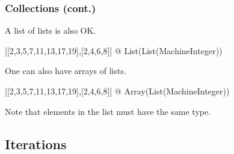 \begin{frame}[fragile]
  \frametitle<presentation>{Collections (cont.)}

A list of lists is also OK.
\begin{myverbatim}
[[2,3,5,7,11,13,17,19],[2,4,6,8]] @ List(List(MachineInteger))
\end{myverbatim}
One can also have arrays of lists.
\begin{myverbatim}
[[2,3,5,7,11,13,17,19],[2,4,6,8]] @ Array(List(MachineInteger))
\end{myverbatim}
Note that elements in the list must have the same type.
\end{frame}
\begin{comment}
<<Collections>>=
aldor -gloop
macro I == MachineInteger;
import from I, List I;
u1 := [2,3,5,7,11,13,17,19]
u2 := [2*i for i in 1..4]
u3 := [2*i for i in 9 .. -9 by -2]
u4 := [5*i for i in 20 .. -20 by -3 | bit?(i,2)]
[3*i for i in u1 | not(i=11)]
[u3.(2*i) for i in 1..3]
[a+b for a in [1, 4, 0] for b in [2,5,7,9,11]]
v1: List List I := [u1,u2]
a1: Array List I := [u1,u2]
#quit
@
\end{comment}

















\subsection{Iterations}
\begin{myverbatim}
\end{myverbatim}

